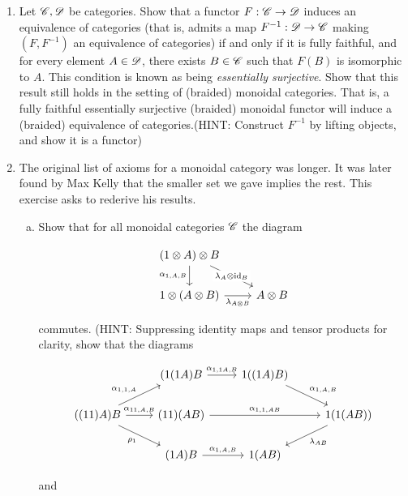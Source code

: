 \documentclass{article}
\theoremstyle{definition}
\numberwithin{figure}{section}
\begin{document}
\begin{enumerate}[\thesection .1.]
\item Let $\mathscr{C},\mathscr{D}$ be categories. Show that a functor $F:\mathscr{C}\to \mathscr{D}$ induces an equivalence of categories (that is, admits a map $F^{-1}:\mathscr{D}\to \mathscr{C}$ making $(F,F^{-1})$ an equivalence of categories) if and only if it is fully faithful, and for every element $A\in \mathscr{D}$, there exists $B\in \mathscr{C}$ such that $F(B)$ is isomorphic to $A$. This condition is known as being \textit{essentially surjective}. Show that this result still holds in the setting of (braided) monoidal categories. That is, a fully faithful essentially surjective (braided) monoidal functor will induce a (braided) equivalence of categories.(HINT: Construct $F^{-1}$ by lifting objects, and show it is a functor)

\item The original list of axioms for a monoidal category was longer. It was later found by Max Kelly \cite{kelly1964maclane} that the smaller set we gave implies the rest. This exercise asks to rederive his results.

\begin{enumerate}[(a)]

\item Show that for all monoidal categories $\mathscr{C}$ the diagram

\[\begin{tikzcd}
	{(1\otimes A)\otimes B} \\
	{1\otimes (A\otimes B)} & {A\otimes B}
	\arrow["{\lambda_A\otimes\id_{B}}"{description}, from=1-1, to=2-2]
	\arrow["{\alpha_{1,A,B}}"', from=1-1, to=2-1]
	\arrow["{\lambda_{A\otimes B}}"', from=2-1, to=2-2]
\end{tikzcd}\]

commutes. (HINT: Suppressing identity maps and tensor products for clarity, show that the diagrams

\[\begin{tikzcd}
	& {(1(1A)B} & {1((1A)B)} \\
	{((11)A)B} & {(11)(AB)} && {1(1(AB))} \\
	& {(1A)B} & {1(AB)}
	\arrow["{\rho_1}"', from=2-1, to=3-2]
	\arrow["{\alpha_{1,1,A}}", from=2-1, to=1-2]
	\arrow["{\alpha_{1,1A,B}}", from=1-2, to=1-3]
	\arrow["{\alpha_{1,A,B}}", from=1-3, to=2-4]
	\arrow["{\alpha_{1,A,B}}", from=3-2, to=3-3]
	\arrow["{\lambda_{AB}}", from=2-4, to=3-3]
	\arrow["{\alpha_{11,A,B}}", from=2-1, to=2-2]
	\arrow["{\alpha_{1,1,AB}}", from=2-2, to=2-4]
\end{tikzcd}\]

and


\end{enumerate}
\end{enumerate}
\end{document}

